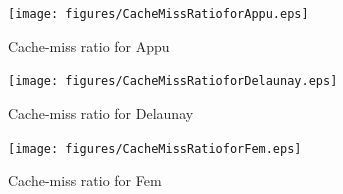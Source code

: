 
\begin{figure}[t]
    \centering
    \texttt{[image: figures/CacheMissRatioforAppu.eps]}
    \caption{Cache-miss ratio for Appu}
    \label{fig:Appu-Cache Miss}
\end{figure}

\begin{figure}[t]
    \centering
    \texttt{[image: figures/CacheMissRatioforDelaunay.eps]}
    \caption{Cache-miss ratio for Delaunay}
    \label{fig:Delaunay-Cache Miss}
\end{figure}

\begin{figure}[t]
    \centering
    \texttt{[image: figures/CacheMissRatioforFem.eps]}
    \caption{Cache-miss ratio for Fem}
    \label{fig:Fem-Cache Miss}
\end{figure}



